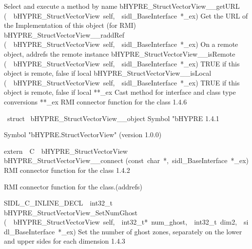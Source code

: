 \documentclass{article}
\begin{document}
\begin{cxxentry}
\begin{cxxentry}
\begin{cxxnames}
        {
Select and execute a method by name}
        {}
\label{cxx.1.4.10}
        {bHYPRE\_StructVectorView\_\_getURL}
        {(\ \ bHYPRE\_StructVectorView\ self,\ \ sidl\_BaseInterface\ *\_ex)}
        {
Get the URL of the Implementation of this object (for RMI)}
        {}
\label{cxx.1.4.11}
        {bHYPRE\_StructVectorView\_\_raddRef}
        {(\ \ bHYPRE\_StructVectorView\ self,\ \ sidl\_BaseInterface\ *\_ex)}
        {
On a remote object, addrefs the remote instance}
        {}
\label{cxx.1.4.12}
        {bHYPRE\_StructVectorView\_\_isRemote}
        {(\ \ bHYPRE\_StructVectorView\ self,\ \ sidl\_BaseInterface\ *\_ex)}
        {
TRUE if this object is remote, false if local}
        {}
\label{cxx.1.4.13}
        {bHYPRE\_StructVectorView\_\_isLocal}
        {(\ \ bHYPRE\_StructVectorView\ self,\ \ sidl\_BaseInterface\ *\_ex)}
        {
TRUE if this object is remote, false if local}
        {}
\label{cxx.1.4.14}
        {**\_ex}
        {}
        {
Cast method for interface and class type conversions}
        {}
\label{cxx.1.4.15}
        {**\_ex}
        {}
        {
RMI connector function for the class}
        {1.4.6}
\end{cxxnames}
\begin{cxxvariable}
{\ struct\ }
        {bHYPRE\_StructVectorView\_\_object}
        {}
        {
Symbol "bHYPRE}
        {1.4.1}
\begin{cxxdoc}

Symbol "bHYPRE.StructVectorView" (version 1.0.0)
\end{cxxdoc}
\end{cxxvariable}
\begin{cxxfunction}
{extern\ \ C\ \ bHYPRE\_StructVectorView\ }
        {bHYPRE\_StructVectorView\_\_connect}
        {(const\ char\ *,\ sidl\_BaseInterface\ *\_ex)}
        {
RMI connector function for the class}
        {1.4.2}
\begin{cxxdoc}

RMI connector function for the class.(addrefs)
\end{cxxdoc}
\end{cxxfunction}
\begin{cxxfunction}
{SIDL\_C\_INLINE\_DECL\ \ int32\_t\ }
        {bHYPRE\_StructVectorView\_SetNumGhost}
        {(\ \ bHYPRE\_StructVectorView\ self,\ \ int32\_t*\ num\_ghost,\ \ int32\_t\ dim2,\ \ sidl\_BaseInterface\ *\_ex)}
        {
Set the number of ghost zones, separately on the lower and upper sides
for each dimension}
        {1.4.3}
\begin{cxxdoc}


\end{cxxdoc}
\end{cxxfunction}
\end{cxxentry}
\end{cxxentry}
\end{document}
